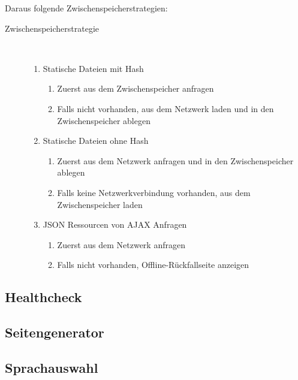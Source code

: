 Daraus folgende Zwischenspeicherstrategien:

\begin{description}
    \item[Zwischenspeicherstrategie]~\par
    \begin{enumerate}
       \item Statische Dateien mit Hash
       \begin{enumerate}
          \item Zuerst aus dem Zwischenspeicher anfragen
          \item Falls nicht vorhanden, aus dem Netzwerk laden und in den Zwischenspeicher ablegen
       \end{enumerate}
       \item Statische Dateien ohne Hash
       \begin{enumerate}
            \item Zuerst aus dem Netzwerk anfragen und in den Zwischenspeicher ablegen
            \item Falls keine Netzwerkverbindung vorhanden, aus dem Zwischenspeicher laden
        \end{enumerate}
        \item JSON Ressourcen von AJAX Anfragen
        \begin{enumerate}
             \item Zuerst aus dem Netzwerk anfragen
             \item Falls nicht vorhanden, Offline-Rückfallseite anzeigen 
         \end{enumerate}
    \end{enumerate}
 \end{description}



\subsection{Healthcheck}

\subsection{Seitengenerator}

\subsection{Sprachauswahl}

